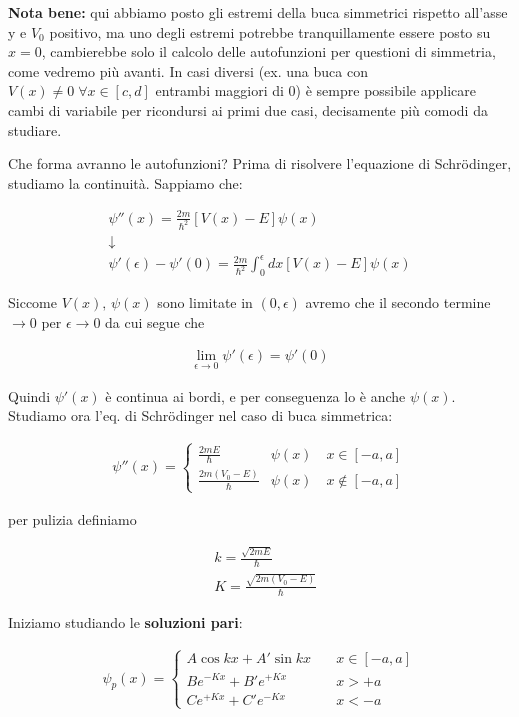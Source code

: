  \textbf{Nota bene:} qui abbiamo posto gli estremi della buca simmetrici rispetto all'asse y e $V_0$ positivo, ma uno degli estremi potrebbe tranquillamente essere posto su $x=0$, cambierebbe solo il calcolo delle autofunzioni per questioni di simmetria, come vedremo più avanti. In casi diversi (ex. una buca con $V(x)\neq 0 \; \forall x \in[c,d]$ entrambi maggiori di 0) è sempre possibile applicare cambi di variabile per ricondursi ai primi due casi, decisamente più comodi da studiare.
  
 Che forma avranno le autofunzioni? Prima di risolvere l'equazione di Schrödinger, studiamo la continuità. Sappiamo che:
 
 \begin{align}
 \psi''(x)= \frac{2m}{\hbar^2}[V(x)-E]\psi(x) \\
 \downarrow \nonumber \\
 \psi'(\epsilon) - \psi'(0)= \frac{2m}{\hbar^2} \int_{0}^{\epsilon}dx [V(x)-E]\psi(x)
  \end{align}
 
 
 Siccome $V(x), \, \psi(x)$ sono limitate in $(0,\epsilon)$ avremo che il secondo termine $\rightarrow 0$ per $\epsilon \rightarrow 0$ da cui segue che
 
 \begin{align}
 \lim_{\epsilon \rightarrow 0}\psi'(\epsilon)= \psi'(0)
 \end{align}
 
 Quindi $\psi'(x)$ è continua ai bordi, e per conseguenza lo è anche $\psi(x)$.
\newpage 
 Studiamo ora l'eq. di Schrödinger nel caso di buca simmetrica:
 
 \begin{align}
 \psi''(x)=
 \left\{
\begin{array}{cc}
\frac{2mE}{\hbar}{}&\psi(x)\quad x\in [-a,a] \\
\frac{2m(V_0 - E)}{\hbar}&\psi(x) \quad x\notin [-a,a]
\end{array} 
 \right.
 \end{align}
 
per pulizia definiamo

\begin{align}
{}&k= \frac{\sqrt{2mE}}{\hbar} \\
&K= \frac{\sqrt{2m(V_0 - E)}}{\hbar}
\end{align}

Iniziamo studiando le \textbf{soluzioni pari}:

\begin{align}
 \psi_p(x)=
 \left\{
 \begin{array}{ccc}
 A\cos{kx}+ A'\sin{kx} \quad {}&x\in [-a,a] \\
 Be^{-Kx}+B'e^{+Kx} \quad &x>+a \\
 Ce^{+Kx}+C'e^{-Kx} \quad &x<-a
 \end{array} 
 \right.
\end{align}
 
